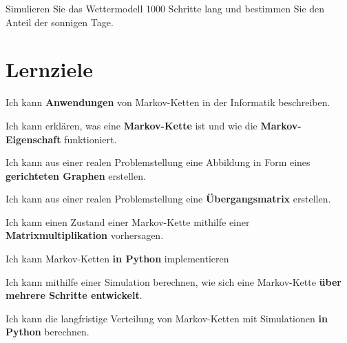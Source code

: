 \begin{myexercise}
    Simulieren Sie das Wettermodell 1000 Schritte lang und bestimmen Sie den Anteil der sonnigen Tage.
\end{myexercise}


\clearpage
\section{Lernziele}
\begin{todolist}
    \item Ich kann \textbf{Anwendungen} von Markov-Ketten in der Informatik beschreiben.
    \item Ich kann erklären, was eine \textbf{Markov-Kette} ist und wie die \textbf{Markov-Eigenschaft} funktioniert.
    \item Ich kann aus einer realen Problemstellung eine Abbildung in Form eines \textbf{gerichteten Graphen} erstellen.
    \item Ich kann aus einer realen Problemstellung eine \textbf{Übergangsmatrix} erstellen.
    \item Ich kann einen Zustand einer Markov-Kette mithilfe einer \textbf{Matrixmultiplikation} vorhersagen.

    \item Ich kann Markov-Ketten \textbf{in Python} implementieren
    \item Ich kann mithilfe einer Simulation berechnen, wie sich eine Markov-Kette \textbf{über mehrere Schritte entwickelt}.
    \item Ich kann die langfristige Verteilung von Markov-Ketten mit Simulationen \textbf{in Python} berechnen.
\end{todolist}
